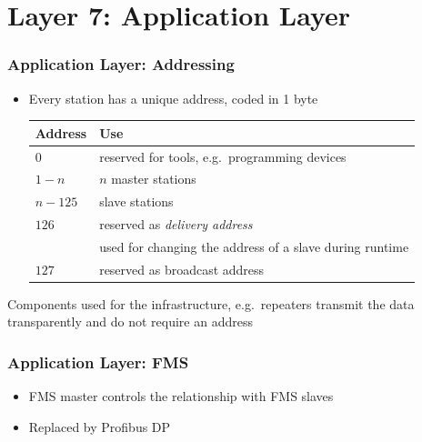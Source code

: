 \documentclass{beamer}
\begin{document}
\section{Layer 7: Application Layer}
\begin{frame}
  \frametitle{Application Layer: Addressing}
  \begin{itemize}
    \item Every station has a unique address, coded in 1 byte
      \center
      \footnotesize
      \begin{tabular}[h]{l|l}
        \textbf{Address}  & \textbf{Use} \\
        \hline
        $0$               & reserved for tools, e.g.\ programming devices \\
        $1 - n$           & $n$ master stations \\
        $n - 125$         & slave stations \\
        $126$             & reserved as \textit{delivery address} \\
                          & used for changing the address of a slave during runtime \\
        $127$             & reserved as broadcast address
      \end{tabular}
  \end{itemize}
  Components used for the infrastructure, e.g.\ repeaters transmit the data transparently
  and do not require an address \\
\end{frame}

\begin{frame}
  \frametitle{Application Layer: FMS}
  \begin{itemize}
    \item FMS master controls the relationship with FMS slaves
    \item Replaced by Profibus DP
  \end{itemize}
\end{frame}
\end{document}
